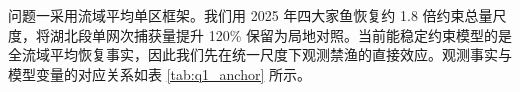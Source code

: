 问题一采用流域平均单区框架。我们用 2025 年四大家鱼恢复约 1.8 倍约束总量尺度，将湖北段单网次捕获量提升 120\% 保留为局地对照。当前能稳定约束模型的是全流域平均恢复事实，因此我们先在统一尺度下观测禁渔的直接效应。观测事实与模型变量的对应关系如表 \ref{tab:q1_anchor} 所示。
